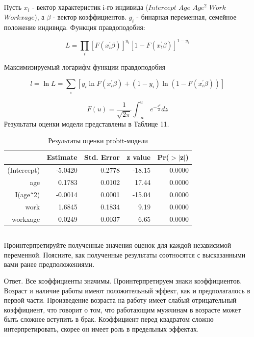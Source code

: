 \documentclass[a4paper,12pt]{article}
\def \b{\beta}
\begin{document}
\section{}
\subsection{}
Пусть $ x_i $ - вектор характеристик i-го индивида ($ Intercept $ $  Age  $ $ Age^2 $ $ Work  $ $ Workxage $), а $ \b $ - вектор коэффициентов. $ y_i $ - бинарная переменная, семейное положение индивида. Функция правдоподобия:

\[
L=\prod_{i}\left[F\left(x_{i}^{\prime} \beta\right)\right]^{y_{i}}\left[1-F\left(x_{t}^{\prime} \beta\right)\right]^{1-y_{i}}
\]

Максимизируемый логарифм функции правдоподобия

\[
l=\ln L=\sum_{i}\left[y_{i} \ln F\left(x_{i}^{\prime} \beta\right)+\left(1-y_{i}\right) \ln \left(1-F\left(x_{i}^{\prime} \beta\right)\right)\right]
\]

\[
F(u)=\frac{1}{\sqrt{2 \pi}} \int_{-\infty}^{u} e^{-\frac{z^{2}}{2}} d z
\]
Результаты оценки модели представлены в Таблице 11.

\begin{table}[ht]
	\centering
	\begin{tabular}{|rrrrr|}
		\hline
		& Estimate & Std. Error & z value & Pr($>$$|$z$|$) \\ 
		\hline
		(Intercept) & -5.0420 & 0.2778 & -18.15 & 0.0000 \\ 
		age & 0.1783 & 0.0102 & 17.44 & 0.0000 \\ 
		I(age\verb|^|2) & -0.0014 & 0.0001 & -15.04 & 0.0000 \\ 
		work & 1.6845 & 0.1834 & 9.19 & 0.0000 \\ 
		workxage & -0.0249 & 0.0037 & -6.65 & 0.0000 \\ 
		\hline
	\end{tabular}
\caption{Результаты оценки probit-модели}
\end{table}

\subsection{}
\Sun Проинтерпретируйте полученные значения оценок для каждой независимой
переменной. Поясните, как полученные результаты соотносятся с высказанными вами
ранее предположениями.

Ответ. Все коэффициенты значимы. Проинтерпретируем знаки коэффициентов. Возраст и наличие работы имеют положительный эффект, как и предполагалось в первой части. Произведение возраста на работу имеет слабый отрицательный коэффициент, что говорит о том, что работающим мужчинам в возрасте может быть сложнее вступить в брак. Коэффициент перед квадратом сложно интерпретировать, скорее он имеет роль в предельных эффектах.
\end{document}
